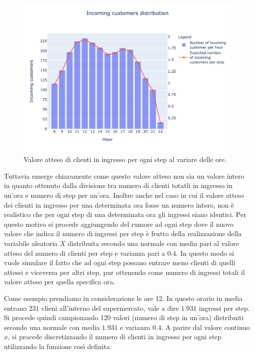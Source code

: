 \begin{figure}[H]
	\centering
	\includegraphics[width=14cm]{"images/per_step_distribution.png"}
	\caption{Valore atteso di clienti in ingresso per ogni step al variare delle ore.}
	\label{fig:per_step_distribution}
\end{figure}

Tuttavia emerge chiaramente come questo valore atteso non sia un valore intero in quanto ottenuto dalla divisione tra numero di clienti totatli in ingresso in un'ora e numero di step per un'ora. Inoltre anche nel caso in cui il valore atteso dei clienti in ingresso per una determinata ora fosse un numero intero, non è realistico che per ogni step di una determinata ora gli ingressi siano identici. Per questo motivo si procede aggiungendo del rumore ad ogni step dove il nuovo valore che indica il numero di ingressi per step è frutto della realizzazione della variabile aleatoria $X$ distribuita secondo una normale con media pari al valore atteso del numero di clienti per step e varianza pari a $0.4$. In questo modo si vuole simulare il fatto che ad ogni step possano entrare meno clienti di quelli attessi e viceversa per altri step, pur ottenendo come numero di ingressi totali il valore atteso per quella specifica ora.

Come esempio prendiamo in considerazione le ore 12. In questo orario in media entrano $231$ clieni all'interno del supermercato, vale a dire $1.931$ ingressi per step. Si procede quindi campionando 120 valori (numero di step in un'ora) distribuiti secondo una normale con media $1.931$ e varianza $0.4$. A parire dal valore continuo $x$, si procede discretizzando il numero di clienti in ingresso per ogni step utilizzando la funzione così definita:

